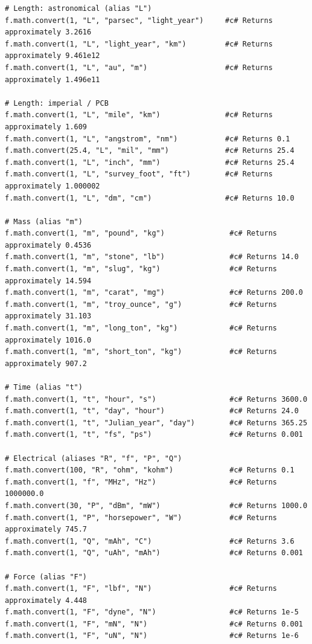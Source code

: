 \begin{verbatim}
# Length: astronomical (alias "L")
f.math.convert(1, "L", "parsec", "light_year")     #c# Returns approximately 3.2616
f.math.convert(1, "L", "light_year", "km")         #c# Returns approximately 9.461e12
f.math.convert(1, "L", "au", "m")                  #c# Returns approximately 1.496e11

# Length: imperial / PCB
f.math.convert(1, "L", "mile", "km")               #c# Returns approximately 1.609
f.math.convert(1, "L", "angstrom", "nm")           #c# Returns 0.1
f.math.convert(25.4, "L", "mil", "mm")             #c# Returns 25.4
f.math.convert(1, "L", "inch", "mm")               #c# Returns 25.4
f.math.convert(1, "L", "survey_foot", "ft")        #c# Returns approximately 1.000002
f.math.convert(1, "L", "dm", "cm")                 #c# Returns 10.0

# Mass (alias "m")
f.math.convert(1, "m", "pound", "kg")               #c# Returns approximately 0.4536
f.math.convert(1, "m", "stone", "lb")               #c# Returns 14.0
f.math.convert(1, "m", "slug", "kg")                #c# Returns approximately 14.594
f.math.convert(1, "m", "carat", "mg")               #c# Returns 200.0
f.math.convert(1, "m", "troy_ounce", "g")           #c# Returns approximately 31.103
f.math.convert(1, "m", "long_ton", "kg")            #c# Returns approximately 1016.0
f.math.convert(1, "m", "short_ton", "kg")           #c# Returns approximately 907.2

# Time (alias "t")
f.math.convert(1, "t", "hour", "s")                 #c# Returns 3600.0
f.math.convert(1, "t", "day", "hour")               #c# Returns 24.0
f.math.convert(1, "t", "Julian_year", "day")        #c# Returns 365.25
f.math.convert(1, "t", "fs", "ps")                  #c# Returns 0.001

# Electrical (aliases "R", "f", "P", "Q")
f.math.convert(100, "R", "ohm", "kohm")             #c# Returns 0.1
f.math.convert(1, "f", "MHz", "Hz")                 #c# Returns 1000000.0
f.math.convert(30, "P", "dBm", "mW")                #c# Returns 1000.0
f.math.convert(1, "P", "horsepower", "W")           #c# Returns approximately 745.7
f.math.convert(1, "Q", "mAh", "C")                  #c# Returns 3.6
f.math.convert(1, "Q", "uAh", "mAh")                #c# Returns 0.001

# Force (alias "F")
f.math.convert(1, "F", "lbf", "N")                  #c# Returns approximately 4.448
f.math.convert(1, "F", "dyne", "N")                 #c# Returns 1e-5
f.math.convert(1, "F", "mN", "N")                   #c# Returns 0.001
f.math.convert(1, "F", "uN", "N")                   #c# Returns 1e-6


\end{verbatim}
